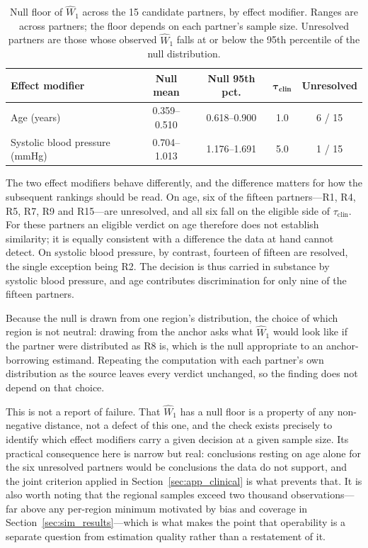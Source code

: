 \documentclass[AMA,Times1COL]{WileyNJDv5}
\begin{document}
\begin{table}[ht]
\centering
\caption{Null floor of $\widehat{W}_1$ across the 15 candidate partners, by effect modifier. Ranges are across partners; the floor depends on each partner's sample size. Unresolved partners are those whose observed $\widehat{W}_1$ falls at or below the 95th percentile of the null distribution.\label{tab:operability}}
\begin{tabular}{lcccc}
\toprule
\textbf{Effect modifier} & \textbf{Null mean} & \textbf{Null 95th pct.} & $\boldsymbol{\tau_{\text{clin}}}$ & \textbf{Unresolved} \\
\midrule
Age (years) & 0.359--0.510 & 0.618--0.900 & 1.0 & 6 / 15 \\
Systolic blood pressure (mmHg) & 0.704--1.013 & 1.176--1.691 & 5.0 & 1 / 15 \\
\bottomrule
\end{tabular}
\end{table}

The two effect modifiers behave differently, and the difference matters for how the subsequent rankings should be read. On age, six of the fifteen partners---R1, R4, R5, R7, R9 and R15---are unresolved, and all six fall on the eligible side of $\tau_{\text{clin}}$. For these partners an eligible verdict on age therefore does not establish similarity; it is equally consistent with a difference the data at hand cannot detect. On systolic blood pressure, by contrast, fourteen of fifteen are resolved, the single exception being R2. The decision is thus carried in substance by systolic blood pressure, and age contributes discrimination for only nine of the fifteen partners.

Because the null is drawn from one region's distribution, the choice of which region is not neutral: drawing from the anchor asks what $\widehat{W}_1$ would look like if the partner were distributed as R8 is, which is the null appropriate to an anchor-borrowing estimand. Repeating the computation with each partner's own distribution as the source leaves every verdict unchanged, so the finding does not depend on that choice.

This is not a report of failure. That $\widehat{W}_1$ has a null floor is a property of any non-negative distance, not a defect of this one, and the check exists precisely to identify which effect modifiers carry a given decision at a given sample size. Its practical consequence here is narrow but real: conclusions resting on age alone for the six unresolved partners would be conclusions the data do not support, and the joint criterion applied in Section~\ref{sec:app_clinical} is what prevents that. It is also worth noting that the regional samples exceed two thousand observations---far above any per-region minimum motivated by bias and coverage in Section~\ref{sec:sim_results}---which is what makes the point that operability is a separate question from estimation quality rather than a restatement of it.
\end{document}
